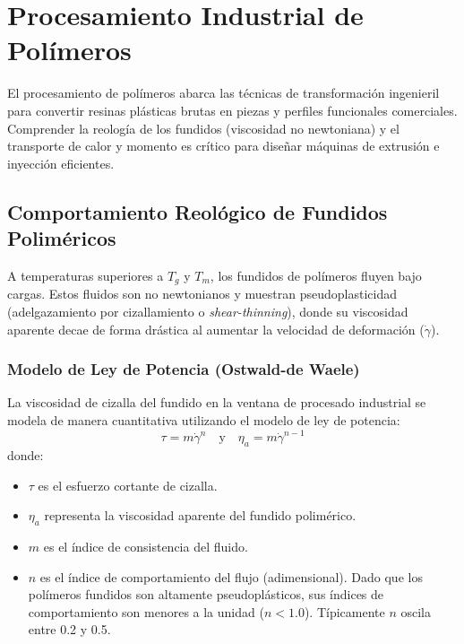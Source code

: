 \chapter{Procesamiento Industrial de Polímeros}
\label{cap:procesamiento}

El procesamiento de polímeros abarca las técnicas de transformación ingenieril para convertir resinas plásticas brutas en piezas y perfiles funcionales comerciales. Comprender la reología de los fundidos (viscosidad no newtoniana) y el transporte de calor y momento es crítico para diseñar máquinas de extrusión e inyección eficientes.

\section{Comportamiento Reológico de Fundidos Poliméricos}

A temperaturas superiores a $T_g$ y $T_m$, los fundidos de polímeros fluyen bajo cargas. Estos fluidos son no newtonianos y muestran pseudoplasticidad (adelgazamiento por cizallamiento o \textit{shear-thinning}), donde su viscosidad aparente decae de forma drástica al aumentar la velocidad de deformación ($\dot{\gamma}$).

\subsection{Modelo de Ley de Potencia (Ostwald-de Waele)}
La viscosidad de cizalla del fundido en la ventana de procesado industrial se modela de manera cuantitativa utilizando el modelo de ley de potencia:
\begin{equation}
    \tau = m \dot{\gamma}^n \quad \text{y} \quad \eta_a = m \dot{\gamma}^{n-1}
    \label{eq:ley_potencia}
\end{equation}
donde:
\begin{itemize}
    \item $\tau$ es el esfuerzo cortante de cizalla.
    \item $\eta_a$ representa la viscosidad aparente del fundido polimérico.
    \item $m$ es el índice de consistencia del fluido.
    \item $n$ es el índice de comportamiento del flujo (adimensional). Dado que los polímeros fundidos son altamente pseudoplásticos, sus índices de comportamiento son menores a la unidad ($n < 1.0$). Típicamente $n$ oscila entre 0.2 y 0.5.
\end{itemize}

